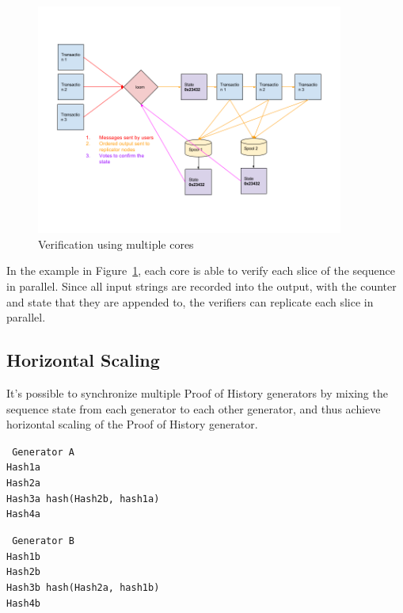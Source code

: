 \documentclass[12pt]{article}
\begin{document}
\begin{figure}
  \begin{center}
    \centering
    \includegraphics[width=0.9\textwidth]{figures/fig_4.png}
    \caption[Figure 4]{Verification using multiple cores\label{fig:poh_verify}}
  \end{center}
  \end{figure}

In the example in Figure~\ref{fig:poh_verify}, each core is able to verify each slice of the sequence in parallel.  Since all input strings are recorded into the output, with the counter and state that they are appended to, the verifiers can replicate each slice in parallel.

\subsection{Horizontal Scaling}
It’s possible to synchronize multiple Proof of History generators by mixing the sequence state from each generator to each other generator, and thus achieve horizontal scaling of the Proof of History generator.

\texttt{
Generator A\\
Hash1a\\
Hash2a\\
Hash3a hash(Hash2b, hash1a)\\
Hash4a\\
}

\texttt{
Generator B\\
Hash1b\\
Hash2b\\
Hash3b hash(Hash2a, hash1b)\\
Hash4b\\
}
\end{document}
